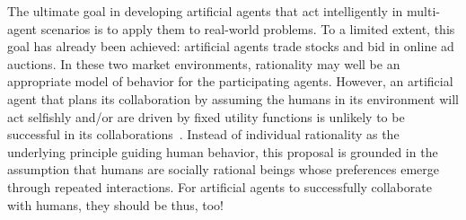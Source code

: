 The ultimate goal in developing artificial agents that act
intelligently in multi-agent scenarios is to apply them to real-world
problems.  To a limited extent, this goal has already been achieved:
artificial agents trade stocks and bid in online ad auctions.  In
these two market environments, rationality may well be an appropriate
model of behavior for the participating agents.  However,
an artificial agent that plans its collaboration by assuming the
humans in its environment will act selfishly and/or are driven by
fixed utility functions is unlikely to be successful in its
collaborations~\cite{Camerer:2003,kahnemanst82}.  Instead of
individual rationality as the underlying principle guiding human
behavior, this proposal is grounded in the assumption that humans are
socially rational beings whose preferences emerge through repeated
interactions.  For artificial agents to successfully collaborate with
humans, they should be thus, too!

